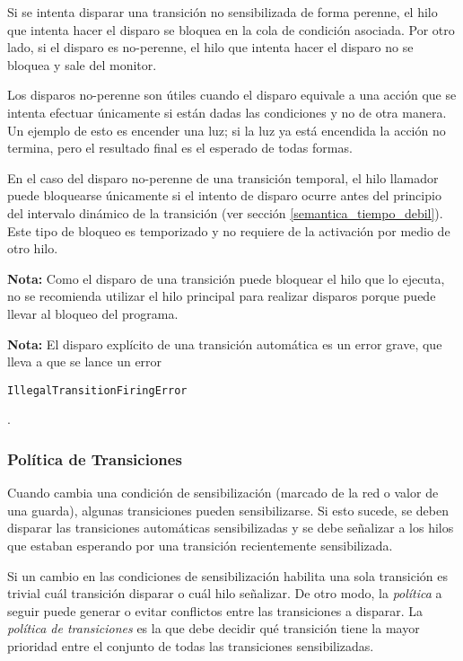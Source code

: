 Si se intenta disparar una transición no sensibilizada de forma perenne, el hilo
que intenta hacer el disparo se bloquea en la cola de condición asociada. Por
otro lado, si el disparo es no-perenne, el hilo que intenta hacer el disparo no
se bloquea y sale del monitor.

Los disparos no-perenne son útiles cuando el disparo equivale a una acción que
se intenta efectuar únicamente si están dadas las condiciones y no de otra
manera. Un ejemplo de esto es encender una luz; si la luz ya está encendida la
acción no termina, pero el resultado final es el esperado de todas formas.

En el caso del disparo no-perenne de una transición temporal, el hilo
llamador puede bloquearse únicamente si el intento de disparo ocurre antes del
principio del intervalo dinámico de la transición (ver sección
\ref{semantica_tiempo_debil}). Este tipo de bloqueo es temporizado y no requiere
de la activación por medio de otro hilo.

\begin{framed}
\textbf{Nota:} Como el disparo de una transición puede bloquear el hilo que lo
ejecuta, no se recomienda utilizar el hilo principal para realizar disparos
porque puede llevar al bloqueo del programa.
\end{framed}

\begin{framed}
\textbf{Nota:} El disparo explícito de una transición automática es un error
grave, que lleva a que se lance un error
\begin{verbatim} 
IllegalTransitionFiringError
\end{verbatim}
.
\end{framed}

\subsubsection{Política de Transiciones}

Cuando cambia una condición de sensibilización (marcado de la red o valor de
una guarda), algunas transiciones pueden sensibilizarse. Si esto sucede, se
deben disparar las transiciones automáticas sensibilizadas y se debe señalizar a
los hilos que estaban esperando por una transición recientemente sensibilizada.

Si un cambio en las condiciones de sensibilización habilita una sola
transición es trivial cuál transición disparar o cuál hilo señalizar. De otro
modo, la \textit{política} a seguir puede generar o evitar conflictos entre las
transiciones a disparar.
La \textit{política de transiciones} es la que debe decidir qué transición tiene
la mayor prioridad entre el conjunto de todas las transiciones sensibilizadas.

